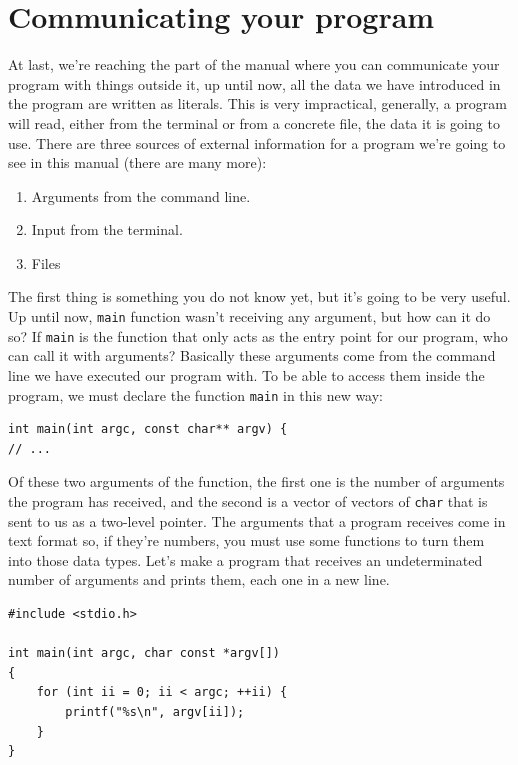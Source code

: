 \documentclass[a4paper]{article}
\begin{document}
\section{Communicating your program}
At last, we're reaching the part of the manual where you can communicate your
program with things outside it, up until now, all the data we have introduced in
the program are written as literals. This is very impractical, generally, a
program will read, either from the terminal or from a concrete file, the data
it is going to use. There are three sources of external information for a
program we're going to see in this manual (there are many more):
\begin{enumerate}
    \item Arguments from the command line.
    \item Input from the terminal.
    \item Files
\end{enumerate}

The first thing is something you do not know yet, but it's going to be very
useful. Up until now, \verb!main! function wasn't receiving any argument, but
how can it do so? If \verb!main! is the function that only acts as the entry
point for our program, who can call it with arguments? Basically these arguments
come from the command line we have executed our program with. To be able to
access them inside the program, we must declare the function \verb!main! in this
new way:

\noindent
\begin{minipage}[H]{\linewidth}
\mbox{}
\begin{lstlisting}[style=C,
caption={Declaration of a \texttt{main} function that receives arguments},
label={lst:mainArguments}]
int main(int argc, const char** argv) {
// ...
\end{lstlisting}
\end{minipage}

Of these two arguments of the function, the first one is the number of arguments
the program has
received, and the second is a vector of vectors of \verb!char! that is sent to
us as a two-level pointer. The arguments that a program receives come in text
format so, if they're numbers, you must use some functions to turn them into
those data types. Let's make a program that receives an undeterminated number
of arguments and prints them, each one in a new line.

\noindent
\begin{minipage}[H]{\linewidth}
\mbox{}
\begin{lstlisting}[style=C,
caption={Ussage of the arguments or a program},
label={lst:argumentProgram}]
#include <stdio.h>

int main(int argc, char const *argv[])
{
    for (int ii = 0; ii < argc; ++ii) {
        printf("%s\n", argv[ii]);
    }
}
\end{lstlisting}
\end{minipage}
\end{document}
